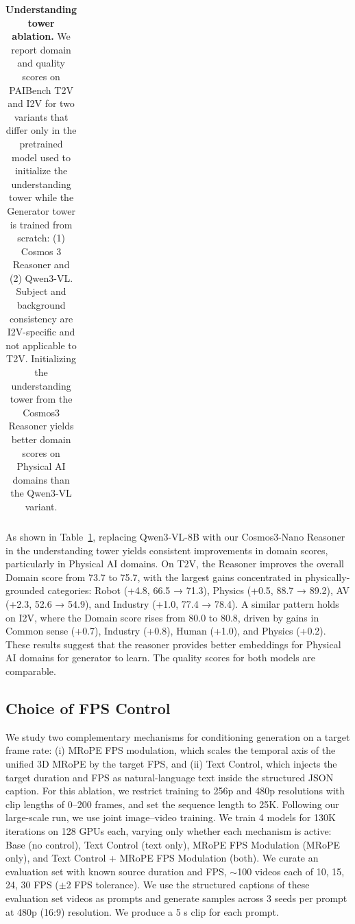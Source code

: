 \documentclass{llmxive}
\begin{document}
\begin{table}[!htbp]
{\begin{tabular}{@{}ll | ccc | cccccc | cccccc | cc@{}}
\bottomrule
\end{tabular}%
}
\label{tab::ablation-understanding-tower}
\caption{\textbf{Understanding tower ablation.} We report domain and quality scores on PAIBench T2V and I2V for two variants that differ only in the pretrained model used to initialize the understanding tower while the Generator tower is trained from scratch: (1) Cosmos 3 Reasoner and (2) Qwen3-VL. Subject and background consistency are I2V-specific and not applicable to T2V. Initializing the understanding tower from the Cosmos3 Reasoner yields better domain scores on Physical AI domains than the Qwen3-VL variant.}
\end{table}

As shown in Table~\ref{tab::ablation-understanding-tower}, replacing Qwen3-VL-8B with our Cosmos3-Nano Reasoner in the understanding tower yields consistent improvements in domain scores, particularly in Physical AI domains. On T2V, the Reasoner improves the overall Domain score from 73.7 to 75.7, with the largest gains concentrated in physically-grounded categories: Robot (+4.8, 66.5 → 71.3), Physics (+0.5, 88.7 → 89.2), AV (+2.3, 52.6 → 54.9), and Industry (+1.0, 77.4 → 78.4). A similar pattern holds on I2V, where the Domain score rises from 80.0 to 80.8, driven by gains in Common sense (+0.7), Industry (+0.8), Human (+1.0), and Physics (+0.2). These results suggest that the reasoner provides better embeddings for Physical AI domains for generator to learn. The quality scores for both models are comparable.

\subsection{Choice of FPS Control}

We study two complementary mechanisms for conditioning generation on a target frame rate: (i) MRoPE FPS modulation, which scales the temporal axis of the unified 3D MRoPE by the target FPS, and (ii) Text Control, which injects the target duration and FPS as natural-language text inside the structured JSON caption. For this ablation, we
restrict training to 256p and 480p resolutions with clip lengths of 0–200 frames, and set the sequence length
to 25K. Following our large-scale run, we use joint image–video training. We train 4 models for 130K iterations on 128 GPUs each, varying only whether each mechanism is active: Base (no control), Text Control (text only), MRoPE FPS Modulation (MRoPE only), and Text Control + MRoPE FPS Modulation (both). We curate an evaluation set with known source duration and FPS, $\sim$100 videos each of 10, 15, 24, 30 FPS ($\pm$2 FPS tolerance). We use the structured captions of these evaluation set videos as prompts and generate samples across 3 seeds per prompt at 480p (16:9) resolution. We produce a 5 s clip for each prompt.
\end{document}
